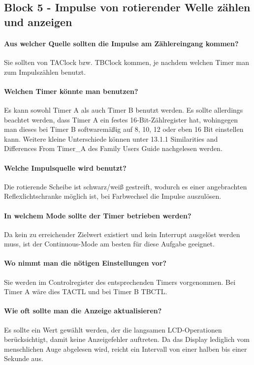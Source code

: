 \documentclass[12pt,a4paper,bibliography=totocnumbered,listof=totocnumbered]{scrartcl}
\begin{document}
\subsection{Block 5 - Impulse von rotierender Welle zählen und anzeigen}
\paragraph{Aus welcher Quelle sollten die Impulse am Zählereingang kommen?}
Sie sollten von TAClock bzw. TBClock kommen, je nachdem welchen Timer man zum Impulszählen benutzt.

\paragraph{Welchen Timer könnte man benutzen?}
Es kann sowohl Timer A als auch Timer B benutzt werden. Es sollte allerdings beachtet werden, dass Timer A ein festes 16-Bit-Zählregister hat, wohingegen man dieses bei Timer B softwaremäßig auf 8, 10, 12 oder eben 16 Bit einstellen kann. Weitere kleine Unterschiede können unter 13.1.1 Similarities and Differences From Timer\_A des Family Users Guide \cite{MSP430x2xx.Users.Guide} nachgelesen werden. 

\paragraph{Welche Impulsquelle wird benutzt?}
Die rotierende Scheibe ist schwarz/weiß gestreift, wodurch es einer angebrachten Reflexlichtschranke möglich ist, bei Farbwechsel die Impulse auszulösen.

\paragraph{In welchem Mode sollte der Timer betrieben werden?}
 Da kein zu erreichender Zielwert existiert und kein Interrupt ausgelöst werden muss, ist der Continuous-Mode am besten für diese Aufgabe geeignet.

\paragraph{Wo nimmt man die nötigen Einstellungen vor?}
Sie werden im Controlregister des entsprechenden Timers vorgenommen. Bei Timer A wäre dies TACTL und bei Timer B TBCTL.

\paragraph{Wie oft sollte man die Anzeige aktualisieren?}
Es sollte ein Wert gewählt werden, der die langsamen LCD-Operationen berücksichtigt, damit keine Anzeigefehler auftreten. Da das Display lediglich vom menschlichen Auge abgelesen wird, reicht ein Intervall von einer halben bis einer Sekunde aus.
\end{document}
